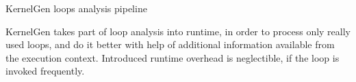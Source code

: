 \documentclass[aspectratio=169]{beamer}
\begin{document}
\begin{frame}[fragile]{{{KernelGen} loops analysis pipeline}}

{KernelGen} takes part of loop analysis into runtime, in order to process only really used loops, and do it better with help of additional information available from the execution context. Introduced runtime overhead is neglectible, if the loop is invoked frequently. 
\vskip 10pt
\setlength{\fboxsep}{0pt}%
\setlength{\fboxrule}{0.25pt}%
\begin{center}
\end{center}

\end{frame}
\end{document}
